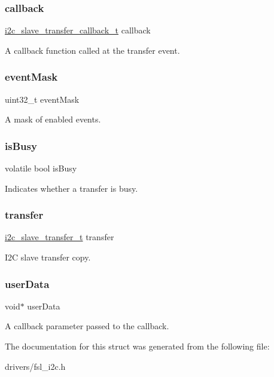 \subsubsection{\texorpdfstring{callback}{callback}}
{\footnotesize\ttfamily \mbox{\hyperlink{group__i2c__driver_ga2583e3d8ebf8d3de410d8b6263238c35}{i2c\+\_\+slave\+\_\+transfer\+\_\+callback\+\_\+t}} callback}

A callback function called at the transfer event. \mbox{\label{struct__i2c__slave__handle_acf2922a79dce3fb9f7c7fe948de1f5a8}} 
\subsubsection{\texorpdfstring{eventMask}{eventMask}}
{\footnotesize\ttfamily uint32\+\_\+t event\+Mask}

A mask of enabled events. \mbox{\label{struct__i2c__slave__handle_a4db252b6dbdb0dc9cc3d7ddbcb5e9511}} 
\subsubsection{\texorpdfstring{isBusy}{isBusy}}
{\footnotesize\ttfamily volatile bool is\+Busy}

Indicates whether a transfer is busy. \mbox{\label{struct__i2c__slave__handle_a8cfa005502ce2f110a54f99672380f5f}} 
\subsubsection{\texorpdfstring{transfer}{transfer}}
{\footnotesize\ttfamily \mbox{\hyperlink{group__i2c__driver_ga69e696cb21165bc58176475879a471cf}{i2c\+\_\+slave\+\_\+transfer\+\_\+t}} transfer}

I2C slave transfer copy. \mbox{\label{struct__i2c__slave__handle_a2e294dd14122c554baa0665072b4ca7a}} 
\subsubsection{\texorpdfstring{userData}{userData}}
{\footnotesize\ttfamily void$\ast$ user\+Data}

A callback parameter passed to the callback. 

The documentation for this struct was generated from the following file\+:\begin{DoxyCompactItemize}
\item 
drivers/fsl\+\_\+i2c.\+h\end{DoxyCompactItemize}
